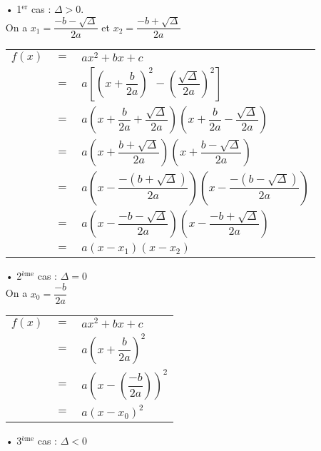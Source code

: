 \begin{itemize}
\item[•] 1$^\mathrm{er}$ cas : $\Delta > 0$. \\

On a $ x_1 = \dfrac{-b - \sqrt{\Delta}}{2a}$ et $ x_2 = \dfrac{-b + \sqrt{\Delta}}{2a}$ \\

\begin{tabular}{lll}
$f\left(x\right)$ & $=$ & $ax^2 + bx + c$ \\
& $=$ & $a \left[\left(x + \dfrac{b}{2a}\right)^2 - \left(\dfrac{\sqrt{\Delta}}{2a}\right)^2 \right]$ \\
& $=$ & $a\left(x + \dfrac{b}{2a} + \dfrac{\sqrt{\Delta}}{2a} \right) \left(x + \dfrac{b}{2a} - \dfrac{\sqrt{\Delta}}{2a}\right)$ \\
& $=$ & $a\left(x + \dfrac{b + \sqrt{\Delta}}{2a} \right)\left(x + \dfrac{b - \sqrt{\Delta}}{2a} \right)$ \\
& $=$ & $a\left(x - \dfrac{-\left(b + \sqrt{\Delta}\right)}{2a} \right)\left(x - \dfrac{-\left(b - \sqrt{\Delta}\right)}{2a} \right)$ \\
& $=$ & $a\left(x - \dfrac{-b - \sqrt{\Delta}}{2a}\right)\left(x - \dfrac{-b + \sqrt{\Delta}}{2a}\right)$ \\
& $=$ & $a \left(x - x_1\right)\left(x - x_2\right)$ \\
\end{tabular}

\vspace*{.3cm}

\item[•]2$^\mathrm{ème}$ cas : $\Delta = 0$ \\

On a $x_0 = \dfrac{-b}{2a}$ \\

\begin{tabular}{lll}
$f\left(x\right)$ & $=$ & $ax^2 + bx + c$ \\
& $=$ & $a\left(x + \dfrac{b}{2a}\right)^2 $ \\
& $=$ & $a\left(x - \left(\dfrac{-b}{2a}\right)\right)^2 $ \\
& $=$ & $a\left(x-x_0\right)^2$ \\
\end{tabular}

\vspace*{.3cm}

\item[•]3$^\mathrm{ème}$ cas : $\Delta < 0$ \\


\end{itemize}
